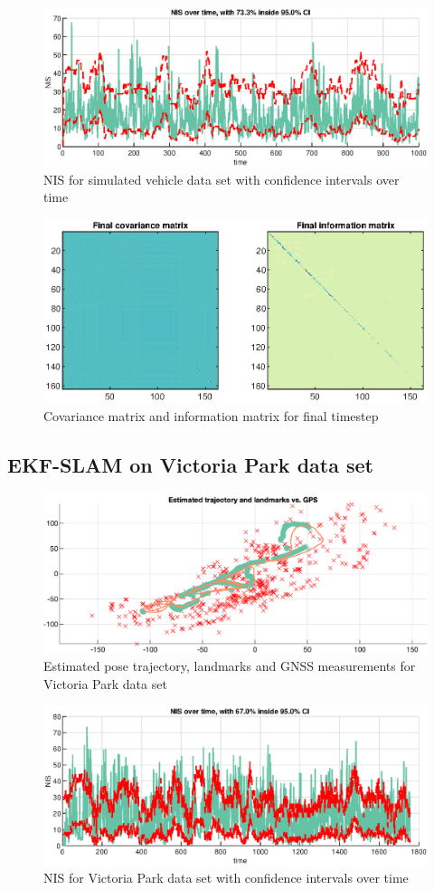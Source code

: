 \begin{figure}[!htb]
    \centering
    \includegraphics[width=0.8\linewidth]{figures/ga_3/sim_NIS.eps}
    \caption{NIS for simulated vehicle data set with confidence intervals over time}
    \label{fig:ga_3_sim_NIS}
\end{figure}

\begin{figure}[!htb]
    \centering
    \includegraphics[width=0.8\linewidth]{figures/ga_3/sim_P.eps}
    \caption{Covariance matrix and information matrix for final timestep}
    \label{fig:ga_3_sim_P}
\end{figure}

\subsection{EKF-SLAM on Victoria Park data set}

\begin{figure}[!htb]
    \centering
    \includegraphics[width=0.8\linewidth]{figures/ga_3/real_trajectory.eps}
    \caption{Estimated pose trajectory, landmarks and GNSS measurements for Victoria Park data set}
    \label{fig:ga_3_real_trajectory}
\end{figure}

\begin{figure}[!htb]
    \centering
    \includegraphics[width=0.8\linewidth]{figures/ga_3/real_NIS.eps}
    \caption{NIS for Victoria Park data set with confidence intervals over time}
    \label{fig:ga_3_real_NIS}
\end{figure}